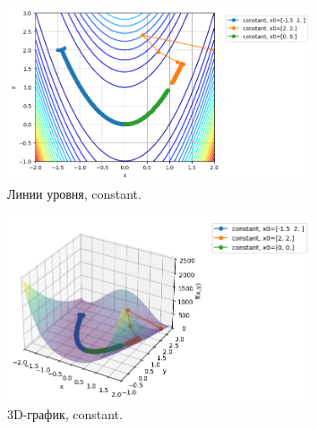 \documentclass[a4paper,12pt]{article}
\begin{document}
\begin{figure}[H]
    \centering
    \includegraphics[width=0.8\textwidth]{images/task2/plot_levels_2_3_constant.png}
    \caption{Линии уровня, constant.}
\end{figure}
\begin{figure}[H]
    \centering
    \includegraphics[width=0.8\textwidth]{images/task2/plot_3d_2_3_constant.png}
    \caption{3D-график, constant.}
\end{figure}
\end{document}

